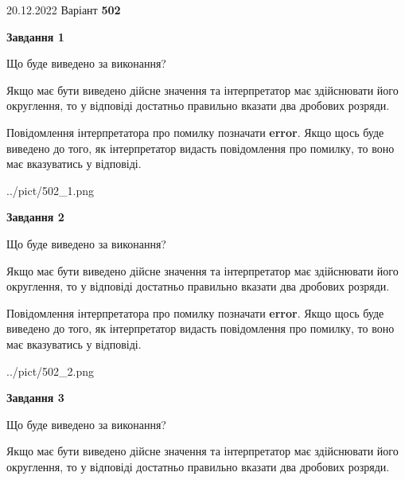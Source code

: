 \documentclass[12pt, ukrainian]{article}
\begin{document}
{20.12.2022 Варіант \No \textbf { 502 }\par}
{
\begin {Large}

{\begin {center}\textbf{Завдання 1}\end {center}}\par
Що буде виведено за виконання? \par

Якщо має бути виведено дійсне значення та інтерпретатор має здійснювати його округлення, 
то у відповіді достатньо правильно вказати два дробових розряди.

Повідомлення інтерпретатора про помилку позначати \textbf{error}.
Якщо щось буде виведено до того, як інтерпретатор видасть повідомлення про помилку, 
то воно має вказуватись у відповіді. \par

\begin{center}
	{../pict/502_1.png}
\end{center}
\newpage

{\begin {center}\textbf{Завдання 2}\end {center}}\par
Що буде виведено за виконання? \par

Якщо має бути виведено дійсне значення та інтерпретатор має здійснювати його округлення, 
то у відповіді достатньо правильно вказати два дробових розряди.

Повідомлення інтерпретатора про помилку позначати \textbf{error}.
Якщо щось буде виведено до того, як інтерпретатор видасть повідомлення про помилку, 
то воно має вказуватись у відповіді. \par

\begin{center}
	{../pict/502_2.png}
\end{center}
\newpage

{\begin {center}\textbf{Завдання 3}\end {center}}\par
Що буде виведено за виконання? \par

Якщо має бути виведено дійсне значення та інтерпретатор має здійснювати його округлення, 
то у відповіді достатньо правильно вказати два дробових розряди.


\end{Large}}
\end{document}

